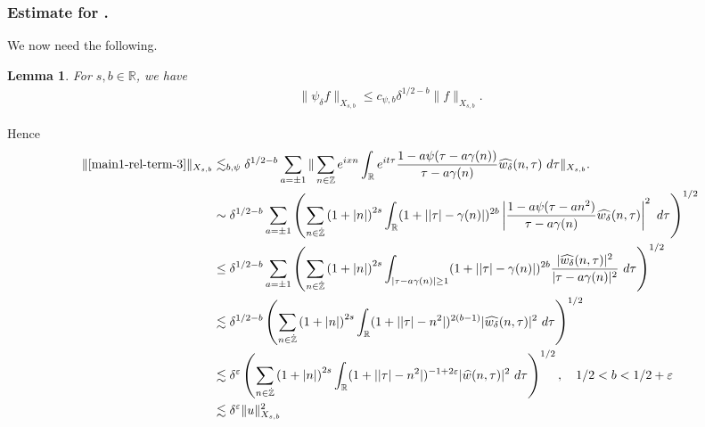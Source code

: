 \documentclass[12pt,reqno]{amsart}
\numberwithin{equation}{section}  %
\renewcommand{\cref}{\Cref}
\newcommand{\rr}{\mathbb{R}}
\newcommand{\zz}{\mathbb{Z}}
\newcommand{\zzdot}{\dot{\zz}}
\newcommand{\wh}{\widehat}
\newcommand{\ee}{\varepsilon}
\newtheorem{lemma}[theorem]{Lemma}
\begin{document}
\subsubsection{Estimate for \cref{main1-rel-term-3}.}
%
%
%
%
%
%
%
%
%
We now need the following.
%
\begin{lemma}
\label{lem:schwartz-mult}
For $s, b \in \rr$, we have
%
%
\begin{equation}
	\label{schwartz-mult}
	\begin{split}
    \|\psi_{\delta} f \|_{X_{s,b}} \le c_{\psi, b} \delta^{1/2-b} \|f \|_{X_{s,b}}.
	\end{split}
\end{equation}
%
%
\end{lemma}
%
Hence
%
%
\begin{equation}
  \label{yu}
	\begin{split}
		\|\cref{main1-rel-term-3}\|_{X_{s,b}} 
    & \lesssim_{b, \psi} \delta^{1/2 - b}
    \sum_{a = \pm 1} \| \sum_{n \in \zz}  e^{ixn} \int_\rr 
		e^{it \tau} \frac{1 - a\psi (\tau - a\gamma(n) ) 
}{\tau - a\gamma(n)} \wh{w_{\delta}}(n, \tau) \ 
		d \tau\|_{X_{s,b}}.
		\\
    & \sim \delta^{1/2 - b}\sum_{a = \pm 1}\left( \sum_{n \in \zzdot} \left (1 + |n| \right )^{2s} \int_\rr
    (1 + |  |\tau| - \gamma(n)|)^{2b} \left | \frac{1 - a\psi(\tau - an^{2 
})}{\tau - a\gamma(n)} 
     \wh{w_{\delta}}(n, \tau) \right |^2 \ d 
		\tau \right)^{1/2}
		\\
    & \le \delta^{1/2 -b}\sum_{a = \pm 1}
    \left( \sum_{n \in \zzdot} \left (1 + |n| \right )^{2s} \int_{| \tau - a\gamma(n)| \ge 1}
    (1 + | |\tau| - \gamma(n)|)^{2b} \frac{|  \wh{w_{\delta}}(n, \tau)|^2}{|\tau - a\gamma(n)|^2} 
		\ d 
		\tau \right)^{1/2}
		\\
		& \lesssim \delta^{1/2 -b}
		\left( \sum_{n \in 
		\zzdot} \left (1 + |n| \right )^{2s} \int_\rr (1 +  || \tau | - n^{2}|)^{2(b-1)} | \wh{w_{\delta}}(n, \tau) |^2 
		 \ d \tau 
		\right)^{1/2}
		\\
		& \lesssim \delta^{\ee}
\left( \sum_{n \in 
		\zzdot} \left (1 + |n| \right )^{2s} \int_\rr (1 +  || \tau | - n^{2}|)^{-1+ 2\ee} | \wh{w}(n, \tau) |^2 
		 \ d \tau 
		\right)^{1/2}, \quad 1/2 < b < 1/2 + \ee
		\\
		& \lesssim \delta^{\ee} \| u \|_{X_{s,b}}^{2}
		\end{split}
\end{equation}
\end{document}
